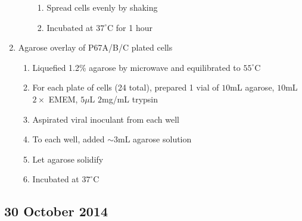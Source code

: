 \begin{enumerate}
\begin{enumerate}
\begin{enumerate}
					\item Spread cells evenly by shaking
					\item Incubated at $37^{\circ}$C for 1 hour
				\end{enumerate}
		\end{enumerate}
	\item Agarose overlay of P67A/B/C plated cells
		\begin{enumerate}
			\item Liquefied 1.2\% agarose by microwave and equilibrated to $55^{\circ}$C
			\item For each plate of cells (24 total), prepared 1 vial of $10$mL agarose, $10$mL $2\times$ EMEM, $5\mu$L $2$mg/mL trypsin
			\item Aspirated viral inoculant from each well
			\item To each well, added $\sim3$mL agarose solution
			\item Let agarose solidify
			\item Incubated at $37^{\circ}$C
		\end{enumerate}
\end{enumerate}

\subsection*{30 October 2014}

